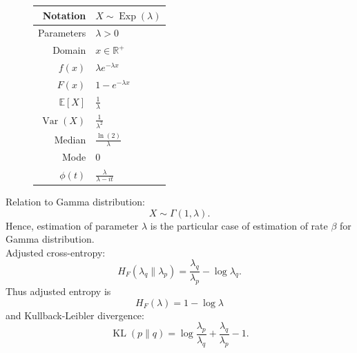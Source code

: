 \documentclass[a4paper,11pt]{article}
\theoremstyle{plain}
\theoremstyle{definition}
\newcommand{\ME}{\mathbb{E}}
\newcommand{\MR}{\mathbb{R}}
\newcommand{\Var}{\operatorname{Var}}
\begin{document}
\begin{figure}[!htb]
\begin{minipage}{0.55\textwidth}
		\end{minipage}
		\begin{minipage}{0.4\textwidth}
		\begin{tabular}{| r | l |}
			\hline
			Notation & $X \sim \operatorname{Exp}(\lambda)$ \\
			\hline
			Parameters & $\lambda > 0$ \\
			\hline
			Domain & $x \in \MR^+$  \\
			\hline
			$f(x)$ & $\lambda e^{-\lambda x}  $ \\
			\hline
			$F(x)$ & $1-e^{-\lambda x} $\\
			\hline
			$\ME[X]$ & $ \frac{1}{\lambda}$ \\
			\hline
			$\Var(X)$ & $\frac{1}{\lambda^2}$ \\
			\hline
			Median & $\frac{\ln(2)}{\lambda}$ \\
			\hline
			Mode & $0$ \\
			\hline
			$\phi(t)$ & $ \frac{\lambda}{\lambda-it}$ \\
			\hline
		\end{tabular}
		\end{minipage}
	\end{figure}

	Relation to Gamma distribution:
	\[X \sim \Gamma(1, \lambda).\]
	Hence, estimation of parameter $\lambda$ is the particular case of estimation of rate $\beta$ for Gamma distribution. \\
	Adjusted cross-entropy:
	\[
	H_F(\lambda_q \| \lambda_p) = \frac{\lambda_q}{\lambda_p}-\log \lambda_q. 
	\]
	Thus adjusted entropy is
	\[
	H_F(\lambda) = 1 - \log \lambda
	\]
	and Kullback-Leibler divergence:
	\[
	\operatorname{KL}(p \| q) = \log \frac{\lambda_p}{\lambda_q} + \frac{\lambda_q}{\lambda_p} - 1.
	\]
	
	\pagebreak
\end{document}
